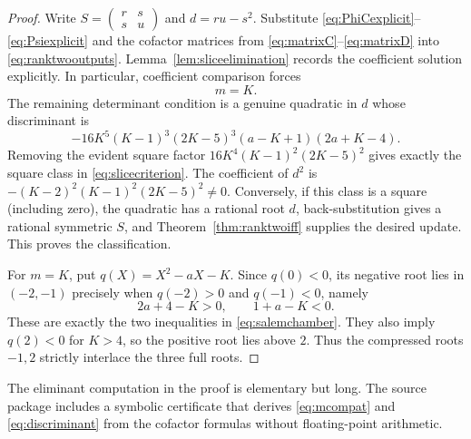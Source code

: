 \documentclass[11pt,reqno]{amsart}
\theoremstyle{definition}
\theoremstyle{remark}
\begin{document}
\begin{proof}
Write $S=\left(\begin{smallmatrix}r&s\\s&u\end{smallmatrix}\right)$ and
$d=ru-s^2$.  Substitute \eqref{eq:PhiCexplicit}--\eqref{eq:Psiexplicit}
and the cofactor matrices from \eqref{eq:matrixC}--\eqref{eq:matrixD} into
\eqref{eq:ranktwooutputs}.  Lemma~\ref{lem:sliceelimination} records the
coefficient solution explicitly.  In particular, coefficient comparison
forces
\begin{equation}\label{eq:mcompat}
 m=K.
\end{equation}
The remaining determinant condition is a genuine quadratic in $d$ whose
discriminant is
\begin{equation}\label{eq:discriminant}
 -16K^5(K-1)^3(2K-5)^3(a-K+1)(2a+K-4).
\end{equation}
Removing the evident square factor $16K^4(K-1)^2(2K-5)^2$ gives exactly the
square class in \eqref{eq:slicecriterion}.  The coefficient of $d^2$ is
$-(K-2)^2(K-1)^2(2K-5)^2\ne0$.  Conversely, if this class is a square
(including zero), the quadratic has a rational root $d$, back-substitution
gives a rational symmetric $S$, and Theorem~\ref{thm:ranktwoiff} supplies the
desired update.  This proves the classification.

For $m=K$, put $q(X)=X^2-aX-K$.  Since $q(0)<0$, its negative root lies in
$(-2,-1)$ precisely when $q(-2)>0$ and $q(-1)<0$, namely
\[
 2a+4-K>0,\qquad 1+a-K<0.
\]
These are exactly the two inequalities in \eqref{eq:salemchamber}.  They also
imply $q(2)<0$ for $K>4$, so the positive root lies above $2$.  Thus the
compressed roots $-1,2$ strictly interlace the three full roots.
\end{proof}

The eliminant computation in the proof is elementary but long.  The source
package includes a symbolic certificate that derives \eqref{eq:mcompat} and
\eqref{eq:discriminant} from the cofactor formulas without floating-point
arithmetic.
\end{document}
